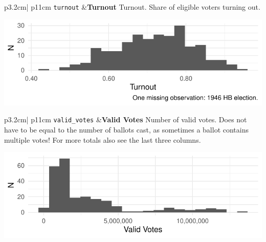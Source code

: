 \documentclass[
]{article}
\begin{document}
\begin{longtable}{p{3.2cm}| p{11cm}}
\texttt{turnout} &\textbf{Turnout}\newline 
Turnout. Share of eligible voters turning out.

\hspace*{.25cm}
\begin{minipage}[t]{\linewidth }
\vspace{0pt}
\includegraphics[width = \linewidth]{cbelec/turnoutplot.pdf}
\end{minipage}


\end{longtable}

\begin{longtable}{p{3.2cm}| p{11cm}}
\texttt{valid\_votes} &\textbf{Valid Votes}\newline 
Number of valid votes. Does not have to be equal to the number of ballots cast, as sometimes a ballot contains multiple votes! For more totals also see the last three columns.

\hspace*{.25cm}
\begin{minipage}[t]{\linewidth }
\vspace{0pt}
\includegraphics[width = \linewidth]{cbelec/validvoteplot.pdf}
\end{minipage}


\end{longtable}
\end{document}
